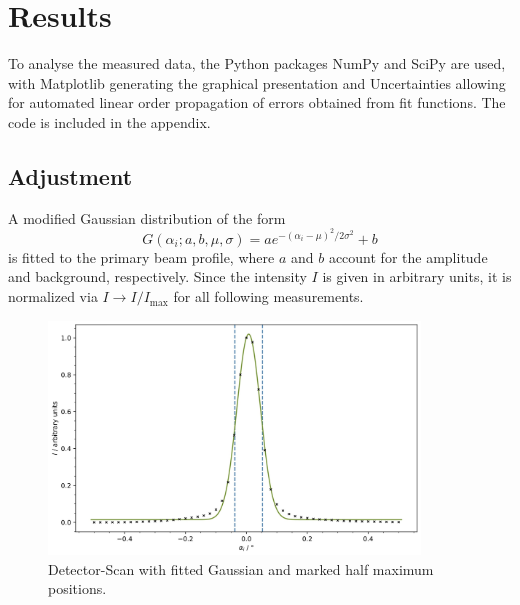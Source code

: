 \section{Results}

To analyse the measured data, the Python \cite{python} packages NumPy \cite{numpy} and SciPy \cite{scipy} are used, with Matplotlib
\cite{matplotlib} generating the graphical presentation and Uncertainties \cite{uncertainties} allowing for automated linear order
propagation of errors obtained from fit functions. The code is included in the appendix.



\subsection{Adjustment}

A modified Gaussian distribution of the form
\begin{equation*}
	G(\alpha_i; a, b, \mu, \sigma) = a e^{-(\alpha_i - \mu)^2 / 2\sigma^2} + b
\end{equation*}
is fitted to the primary beam profile, where $a$ and $b$ account for the amplitude and background, respectively. Since the intensity
$I$ is given in arbitrary units, it is normalized via $I \rightarrow I / I_\text{max}$ for all following measurements.

\begin{figure}[H]
	\centering
	\includegraphics[width=0.88\textwidth]{content/plots/1.jpg}
	\caption{Detector-Scan with fitted Gaussian and marked half maximum positions.}
	\label{fig:detector-scan}
\end{figure}

